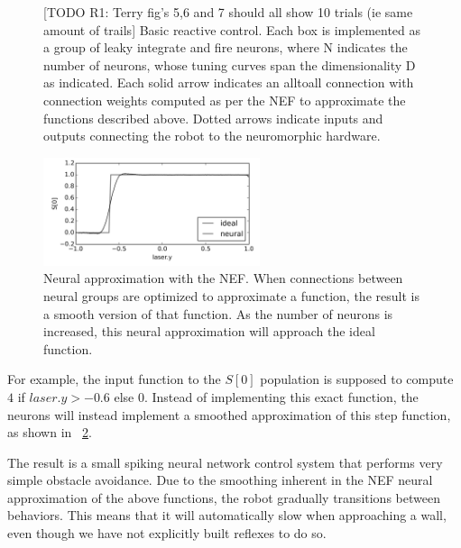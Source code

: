 \documentclass[conference]{IEEEtran}
\begin{document}
\begin{figure}[!t]
\centering
\caption{[TODO R1: Terry fig's 5,6 and 7 should all show 10 trials (ie same amount of trails] Basic reactive control. Each box is implemented as a group of leaky integrate and fire neurons, where N indicates the number of neurons, whose tuning curves span the dimensionality D as indicated. Each solid arrow indicates an alltoall connection with connection weights computed as per the NEF to approximate the functions described above. Dotted arrows indicate inputs
and outputs connecting the robot to the neuromorphic hardware.}
\label{Flow}
\end{figure}


\begin{figure}[!t]
\centering
\includegraphics[width=2.5in]{smoothing.png}
\caption{Neural approximation with the NEF. When connections between neural groups are optimized to approximate a function, the result is a smooth version of that function. As the number of neurons is increased, this neural approximation will approach the ideal function.}
\label{NEF}
\end{figure}

For example, the input function to 
the $S[0]$ population is supposed to compute $4$ if $laser.y > -0.6$ else $0$. 
Instead of implementing this exact function, the neurons will instead implement
a smoothed approximation of this step function, as shown in
\figurename~\ref{NEF}.

The result is a small spiking neural network control system that performs very 
simple obstacle avoidance. Due to the smoothing inherent in the NEF neural 
approximation of the above functions, the robot gradually transitions between 
behaviors. This means that it will automatically slow when approaching a wall, 
even though we have not explicitly built reflexes to do so.  
\end{document}
